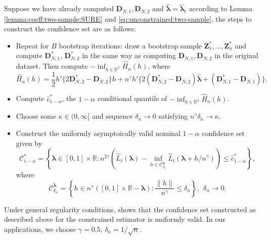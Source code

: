 \documentclass[12pt,letterpaper]{article}
\begin{document}
Suppose we have already computed $\mathbf{D}_{N,1}, \mathbf{D}_{N,2}$ and $\hat{\boldsymbol{\lambda}}=\hat{\boldsymbol{\lambda}}_{\mathrm{t}}$ according to Lemma \ref{lemma:coeff:two-sample:SURE} and \eqref{eq:unconstrained:two-sample}, the steps to construct the confidence set are as follows: 
\begin{itemize}
    \item[(1)] Repeat for $B$ bootstrap iterations: draw a bootstrap sample $\mathbf{Z}_1^*,\ldots,\mathbf{Z}_n^*$ and compute $\mathbf{D}_{N,1}^*$, $\mathbf{D}_{N,2}^*$ in the same way as computing $\mathbf{D}_{N,1}, \mathbf{D}_{N,2}$ in the original dataset. Then compute $-\displaystyle\inf_{h\in\mathbb{R}^2}\hat{H}_n(h)$, where 
    \begin{equation}\label{eq:objective:bootstrap}
        \hat{H}_n(h)=\frac{1}{2}h'\{2\mathbf{D}_{N,2}^*-\mathbf{D}_{N,2}\}h+n^{\gamma}h'\{2(\mathbf{D}_{N,2}^*-\mathbf{D}_{N,2})\hat{\boldsymbol{\lambda}}+(\mathbf{D}_{N,1}^*-\mathbf{D}_{N,1})\}.
    \end{equation}
    \item[(2)] Compute $\hat{c}_{1-\alpha}^*$, the $1-\alpha$ conditional quantile of $-\displaystyle\inf_{h\in\mathbb{R}^2}\hat{H}_n(h)$.
    \item[(3)] Choose some $\kappa\in(0,\infty]$ and sequence $\delta_n\rightarrow0$ satisfying $n^{\gamma}\delta_n\rightarrow\kappa$. 
    \item[(4)] Construct the uniformly asymptoically valid nominal $1-\alpha$ confidence set given by
    \begin{equation}\label{eq:confidence:set:1-alpha}
        \mathcal{C}_{1-\alpha}^*=\left\{\boldsymbol{\lambda}\in[0,1]\times\mathbb{R}: n^{2\gamma}\left(\hat{L}_t(\boldsymbol{\lambda})-\inf_{h\in\mathcal{C}_{\delta_n}^{\boldsymbol{\lambda}}}\hat{L}_t(\boldsymbol{\lambda}+h/n^{\gamma})\right)\leq\hat{c}_{1-\alpha}^*\right\},
    \end{equation}
    where
    \begin{equation}\label{eq:C:confidence:term}
        \mathcal{C}_{\delta_n}^{\boldsymbol{\lambda}}=\left\{h\in n^{\gamma}([0,1]\times\mathbb{R}-\boldsymbol{\lambda}): \frac{\|h\|}{n^{\gamma}}\leq\delta_n\right\},\ \ \delta_n\rightarrow0.
    \end{equation}
\end{itemize}
Under general regularity conditions, \citet{li2024inference} shows that the confidence set constructed as described above for the constrained estimator is uniformly valid. In our applications, we choose $\gamma=0.5$, $\delta_n=1/\sqrt{n}$.
\end{document}
